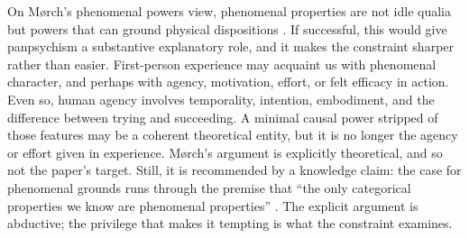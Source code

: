 On M{\o}rch's phenomenal powers view, phenomenal properties are not idle qualia but powers that can ground physical dispositions \citep{morch2018,morchForthcoming}. If successful, this would give panpsychism a substantive explanatory role, and it makes the constraint sharper rather than easier. First-person experience may acquaint us with phenomenal character, and perhaps with agency, motivation, effort, or felt efficacy in action. Even so, human agency involves temporality, intention, embodiment, and the difference between trying and succeeding. A minimal causal power stripped of those features may be a coherent theoretical entity, but it is no longer the agency or effort given in experience. M{\o}rch's argument is explicitly theoretical, and so not the paper's target. Still, it is recommended by a knowledge claim: the case for phenomenal grounds runs through the premise that ``the only categorical properties we know are phenomenal properties'' \citep{morch2018}. The explicit argument is abductive; the privilege that makes it tempting is what the constraint examines.

